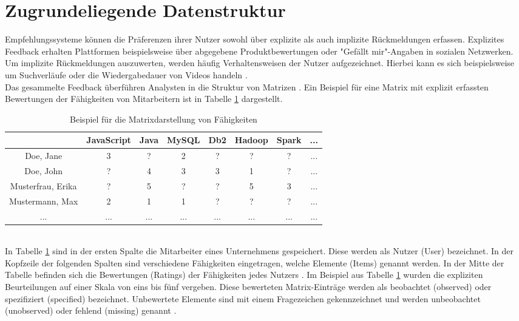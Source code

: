 \section{Zugrundeliegende Datenstruktur}
\label{ch:empfehlungssysteme:arbeitsweise}
Empfehlungssysteme können die Präferenzen ihrer Nutzer sowohl über explizite als auch implizite Rückmeldungen erfassen. Explizites Feedback erhalten Plattformen beispielsweise über abgegebene Produktbewertungen oder "Gefällt mir"-Angaben in sozialen Netzwerken. Um implizite Rückmeldungen auszuwerten, werden häufig Verhaltensweisen der Nutzer aufgezeichnet. Hierbei kann es sich beispielsweise um Suchverläufe oder die Wiedergabedauer von Videos handeln \cite[S. 3]{pu:2012}.\\
Das gesammelte Feedback überführen Analysten in die Struktur von Matrizen \cite[S. 11f.]{recommenderSystems:2016}. Ein Beispiel für eine Matrix mit explizit erfassten Bewertungen der Fähigkeiten von Mitarbeitern ist in Tabelle \ref{tbl:empfehlungssysteme:arbeitsweise:tbl1} dargestellt.
\begin{table}[h]
	\centering
	\begin{tabular}{c|c|c|c|c|c|c|c}
	 & JavaScript & Java & MySQL & Db2 & Hadoop & Spark & ... \\
	\hline
	Doe, Jane & 3 & ? & 2 & ? & ? & ? & ... \\
	Doe, John & ? & 4 & 3 & 3 & 1 & ? & ... \\
	Musterfrau, Erika & ? & 5 & ? & ? & 5 & 3 & ... \\
	Mustermann, Max & 2 & 1 & 1 & ? & ? & ? & ... \\
	... & ... & ... & ... & ... & ... & ... & ... \\
	\end{tabular}
	\caption{Beispiel für die Matrixdarstellung von Fähigkeiten}
	\label{tbl:empfehlungssysteme:arbeitsweise:tbl1}
\end{table}\\
In Tabelle \ref{tbl:empfehlungssysteme:arbeitsweise:tbl1} sind in der ersten Spalte die Mitarbeiter eines Unternehmens gespeichert. Diese werden als Nutzer (User) bezeichnet. In der Kopfzeile der folgenden Spalten sind verschiedene Fähigkeiten eingetragen, welche Elemente (Items) genannt werden. In der Mitte der Tabelle befinden sich die Bewertungen (Ratings) der Fähigkeiten jedes Nutzers \cite[S. 1f.]{strub:2016}. Im Beispiel aus Tabelle \ref{tbl:empfehlungssysteme:arbeitsweise:tbl1} wurden die expliziten Beurteilungen auf einer Skala von eins bis fünf vergeben. Diese bewerteten Matrix-Einträge werden  als beobachtet (observed) oder spezifiziert (specified) bezeichnet. Unbewertete Elemente sind mit einem Fragezeichen gekennzeichnet und werden unbeobachtet (unobserved) oder fehlend (missing) genannt \cite[S. 8]{recommenderSystems:2016}.\\
